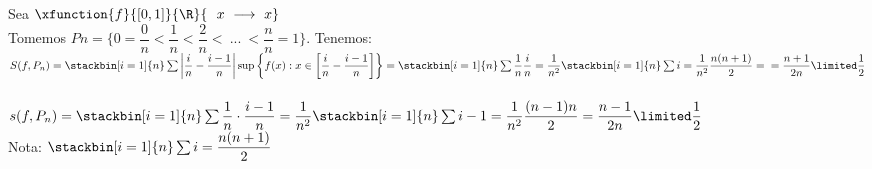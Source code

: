 	\begin{ejem} Sea $\xfunction{f}{[0,1]}{\R}{\ \ x\ \longrightarrow\ x}$\\
	Tomemos $Pn=\{0=\dfrac{0}{n}<\dfrac{1}{n}<\dfrac{2}{n}<\ ...\ < \dfrac{n}{n}=1\}$. Tenemos:\\
$S(f,P_n	)=\stackbin[i=1]{n}\sum \left|\dfrac{i}{n}-\dfrac{i-1}{n}\right|\sup\left\{f(x):x\in\left[\dfrac{i}{n}-\dfrac{i-1}{n}\right]\right\}=\stackbin[i=1]{n}\sum \dfrac{1}{n}\dfrac{i}{n}=\dfrac{1}{n^2}\stackbin[i=1]{n}\sum i=\dfrac{1}{n^2}\dfrac{n(n+1)}{2}=\\=\dfrac{n+1}{2n}\limited \dfrac{1}{2}$\\\\
$s(f,P_n)=\stackbin[i=1]{n}\sum\dfrac{1}{n}\cdot\dfrac{i-1}{n}=\dfrac{1}{n^2}\stackbin[i=1]{n}\sum i-1=\dfrac{1}{n^2}\dfrac{(n-1)n}{2}=\dfrac{n-1}{2n}\limited\dfrac{1}{2}$\\
Nota: $\stackbin[i=1]{n}\sum i = \dfrac{n(n+1)}{2}$
	\end{ejem}
	

